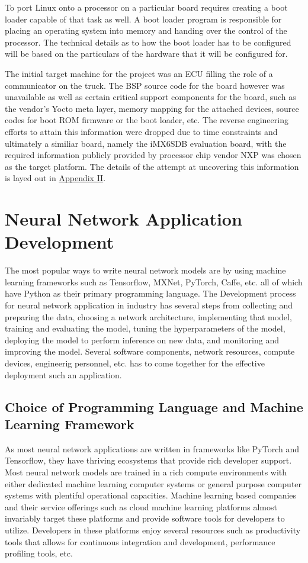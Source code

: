 To port Linux onto a processor on a particular board requires creating a boot loader capable of that task as well. A boot loader program is responsible for placing an operating system into memory and handing over the control of the processor. The technical details as to how the boot loader has to be configured will be based on the particulars of the hardware that it will be configured for.

The initial target machine for the project was an ECU filling the role of a communicator on the truck. The BSP source code for the board however was unavailable as well as certain critical support components for the board, such as the vendor's Yocto meta layer, memory mapping for the attached devices, source codes for boot ROM firmware or the boot loader, etc. The reverse engineering efforts to attain this information were dropped due to time constraints and ultimately a similiar board, namely the iMX6SDB evaluation board, with the required information publicly provided by processor chip vendor NXP was chosen as the target platform. The details of the attempt at uncovering this information is layed out in \hyperref[rtc-c300]{Appendix II}.

\section{Neural Network Application Development}

The most popular ways to write neural network models are by using machine learning frameworks such as Tensorflow, MXNet, PyTorch, Caffe, etc. all of which have Python as their primary programming language. The Development process for neural network application in industry has several steps from collecting and preparing the data, choosing a network architecture, implementing that model, training and evaluating the model, tuning the hyperparameters of the model, deploying the model to perform inference on new data, and monitoring and improving the model. Several software components, network resources, compute devices, engineerig personnel, etc. has to come together for the effective deployment such an application.

\subsection{Choice of Programming Language and Machine Learning Framework}

As most neural network applications are written in frameworks like PyTorch and Tensorflow, they have thriving ecosystems that provide rich developer support. Most neural network models are trained in a rich compute environments with either dedicated machine learning computer systems or general purpose computer systems with plentiful operational capacities. Machine learning based companies and their service offerings such as cloud machine learning platforms almost invariably target these platforms and provide software tools for developers to utilize. Developers in these platforms enjoy several resources such as productivity tools that allows for continuous integration and development, performance profiling tools, etc.

